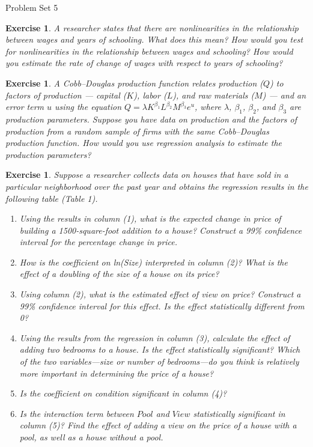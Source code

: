 \documentclass{article}
\newtheorem{exercise}[theorem]{Exercise}
\begin{document}
\begin{center} 
{\Large Problem Set 5}
\end{center}


\begin{exercise}
A researcher states that there are nonlinearities in the relationship between wages and years of schooling. What does this mean? How would you test for nonlinearities in the relationship between wages and schooling? How would you estimate the rate of change of wages with respect to years of schooling?
\end{exercise}


\begin{exercise}
A Cobb–Douglas production function relates production ($Q$) to factors of production --- capital ($K$), labor ($L$), and raw materials ($M$) --- and an error term $u$ using the equation $Q = \lambda K^{\beta_1}L^{\beta_2}M^{\beta_3}e^u$, where $\lambda$, $\beta_1$, $\beta_2$, and $\beta_3$ are production parameters. Suppose you have data on production and the factors of production from a random sample of firms with the same Cobb–Douglas production function. How would you use regression analysis to estimate the production parameters?
\end{exercise}


\begin{exercise}
Suppose a researcher collects data on houses that have sold in a particular neighborhood over the past year and obtains the regression results in the following table (Table 1).
\begin{enumerate}[label=(\alph*)]
    \item Using the results in column (1), what is the expected change in price of building a 1500-square-foot addition to a house? Construct a 99\% confidence interval for the percentage change in price.
    \item How is the coefficient on ln(Size) interpreted in column (2)? What is the effect of a doubling of the size of a house on its price?
    \item Using column (2), what is the estimated effect of view on price? Construct a 99\% confidence interval for this effect. Is the effect statistically different from 0?
    \item Using the results from the regression in column (3), calculate the effect of adding two bedrooms to a house. Is the effect statistically significant? Which of the two variables—size or number of bedrooms—do you think is relatively more important in determining the price of a house?
    \item Is the coefficient on condition significant in column (4)?
    \item Is the interaction term between $Pool$ and $View$ statistically significant in column (5)? Find the effect of adding a view on the price of a house with a pool, as well as a house without a pool.
\end{enumerate}
\end{exercise}
\end{document}
